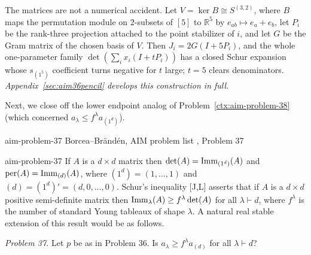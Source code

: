 \begin{cxrefutation}
\begin{remark}
The matrices are not a numerical accident.  Let $V=\ker B\cong S^{(3,2)}$, where $B$ maps the permutation module on $2$-subsets of $[5]$ to $\mathbb R^5$ by $e_{ab}\mapsto e_a+e_b$, let $P_i$ be the rank-three projection attached to the point stabilizer of $i$, and let $G$ be the Gram matrix of the chosen basis of $V$.  Then $J_i=2G(I+5P_i)$, and the whole one-parameter family $\det(\sum_ix_i(I+tP_i))$ has a closed Schur expansion whose $s_{(1^5)}$ coefficient turns negative for $t$ large; $t=5$ clears denominators.  \emph{Appendix~\ref{sec:aim36pencil} develops this construction in full.}
\end{remark}

\end{cxrefutation}


\begin{cxcredits}
\end{cxcredits}

Next, we close off the lower endpoint analog of Problem~\ref{ctx:aim-problem-38} (which concerned $a_\lambda \le f^\lambda a_{(1^d)}$).
\begin{cxsource}{aim-problem-37}
Borcea--Br\"and\'en, AIM problem list \citeyearpar{AIMStableProblems}, Problem 37
\end{cxsource}

\begin{cxstatement}{aim-problem-37}
If $A$ is a $d\times d$ matrix then $\det(A)=\operatorname{Imm}_{(1^d)}(A)$ and $\operatorname{per}(A)=\operatorname{Imm}_{(d)}(A)$, where $(1^d)=(1,\ldots,1)$ and $(d)=(1^d)'=(d,0,\ldots,0)$.  Schur's inequality [J,L] asserts that if $A$ is a $d\times d$ positive semi-definite matrix then $\operatorname{Imm}_\lambda(A)\ge f^\lambda\det(A)$ for all $\lambda\vdash d$, where $f^\lambda$ is the number of standard Young tableaux of shape $\lambda$.  A natural real stable extension of this result would be as follows.

\emph{Problem 37.}  Let $p$ be as in Problem 36.  Is $a_\lambda\ge f^\lambda a_{(d)}$ for all $\lambda\vdash d$?
\end{cxstatement}

